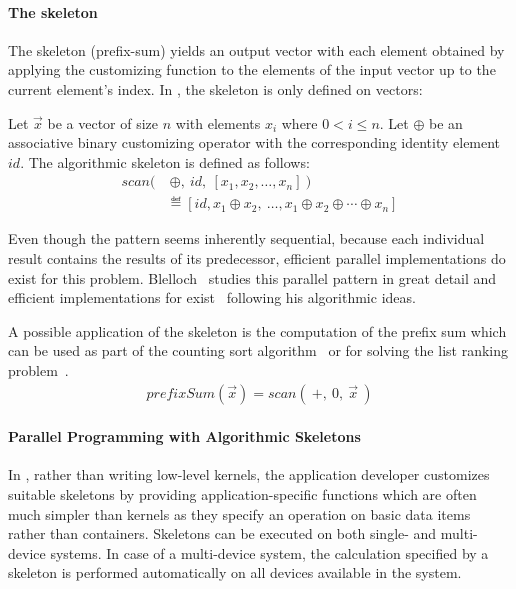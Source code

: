 \paragraph{The \scan skeleton}
The \scan skeleton (\aka prefix-sum) yields an output vector with each element obtained by applying the customizing function to the elements of the input vector up to the current element's index.
In \SkelCL, the \scan skeleton is only defined on vectors:
\begin{definition}
  \label{definition:scan}
  Let $\vec{x}$ be a vector of size $n$ with elements $x_i$ where $0 < i \leq n$.
  Let $\oplus$ be an associative binary customizing operator with the corresponding identity element $id$.
  The algorithmic skeleton \scan is defined as follows:
  \begin{equation*}
    \begin{split}
    scan \big(&\ \oplus,\ id,\ [x_1, x_2, \dots, x_n]\ \big) \\
      &\eqdef [id, x_1 \oplus x_2,\ \dots,x_1 \oplus x_2 \oplus \cdots \oplus x_n]
    \end{split}
  \end{equation*}
\end{definition}
\noindent
Even though the \scan pattern seems inherently sequential, because each individual result contains the results of its predecessor, efficient parallel implementations do exist for this problem.
Blelloch~\cite{Blelloch1991} studies this parallel pattern in great detail and efficient implementations for \GPUs exist~\cite{HarrisSeOw2007} following his algorithmic ideas.

A possible application of the \scan skeleton is the computation of the prefix sum which can be used as part of the counting sort algorithm~\cite{Knuth1998} or for solving the list ranking problem~\cite{ColeVi1989}.
\begin{align*}
  prefixSum(\vec{x}) = scan(\ +,\ 0,\ \vec{x}\ )
\end{align*}

\paragraph{Parallel Programming with Algorithmic Skeletons}
In \SkelCL, rather than writing low-level kernels, the application developer customizes suitable skeletons by providing application-specific functions which are often much simpler than kernels as they specify an operation on basic data items rather than containers.
Skeletons can be executed on both single- and multi-device systems.
In case of a multi-device system, the calculation specified by a skeleton is performed automatically on all devices available in the system.

